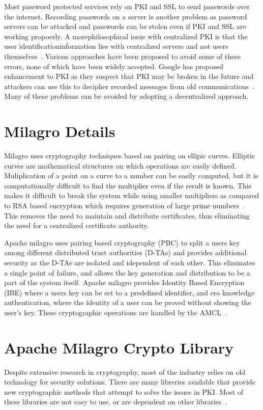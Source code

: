 Most password protected services rely on PKI and SSL to send passwords
over the internet. Recording passwords on a server is another problem
as password servers can be attacked and passwords can be stolen even
if PKI and SSL are working propoerly. A morephilosophical issue with
centralized PKI is that the user identificationinformation lies with
centralized servers and not users
themselves~\cite{distlab-pki-problems}.  Various approaches have been
proposed to avoid some of these errors, none of which have been widely
accepted. Google has proposed enhancement to PKI as they suspect that
PKI may be broken in the future and attackers can use this to decipher
recorded messages from old
communications~\cite{securityweek-ssl-threats}.  Many of these
problems can be avoided by adopting a decentralized approach.


\section{Milagro Details}
Milagro uses cryptography techniques based on pairing on ellipic
curves. Elliptic curves are mathematical structures on which
operations are easily defined. Muliplication of a point on a curve to
a number can be easily computed, but it is computationally difficult
to find the multiplier even if the result is known. This makes it
difficult to break the system while using smaller multipliers as
compared to RSA based encryption which requires generation of large
prime numbers~\cite{milagro-concepts}. This removes the need to
maintain and distribute certificates, thus eliminating the need for a
centralized certificate authority.

Apache milagro uses pairing based cryptography (PBC) to split a users
key among different distributed trust authorities (D-TAs) and provides
additional security as the D-TAs are isolated and idependent of each
other. This eliminates a single point of failure, and allows the key
generation and distribution to be a part of the system itself. Apache
milagro provides Identity Based Encryption (IBE) where a users key can
be set to a predefined identifier, and ero knowledge authentication,
where the identity of a user can be proved without showing the user's
key.  These cryptographic operations are handled by the
AMCL~\cite{milagro-concepts}.

\section{Apache Milagro Crypto Library}
Despite extensive research in cryptography, most of the industry
relies on old technology for security solutions. There are many
libreries available that provide new cryptographic methods that
attempt to solve the issues in PKI\@. Most of these libraries are not
easy to use, or are dependent on other
libraries~\cite{mcl-white-paper}.

